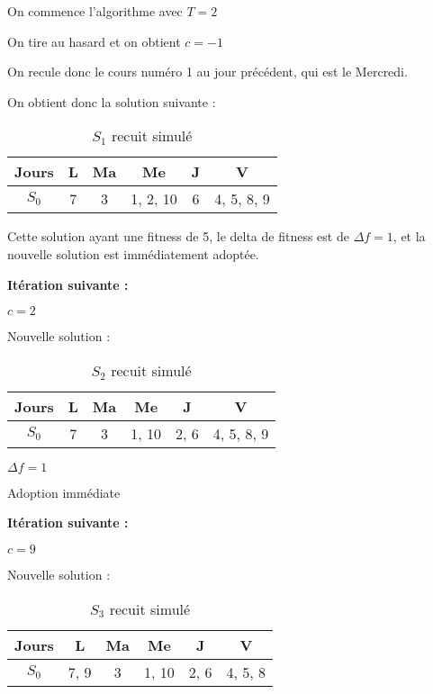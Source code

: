 {\setlength{\parindent}{0cm}

On commence l'algorithme avec $T=2$

    On tire au hasard et on obtient $c = -1$

    On recule donc le cours numéro 1 au jour précédent, qui est le Mercredi.

On obtient donc la solution suivante :


    \begin{table}[!h]
        \centering
        \begin{tabular}{|c|c|c|c|c|c|}
            \hline
            Jours & L & Ma & Me       & J & V          \\
            \hline
            $S_0$ & 7 & 3  & 1, 2, 10 & 6 & 4, 5, 8, 9 \\
            \hline
        \end{tabular}\caption{$S_1$ recuit simulé}
    \end{table}

    Cette solution ayant une fitness de 5, le delta de fitness est de $\Delta f = 1$, et la nouvelle solution est immédiatement adoptée.

\textbf{Itération suivante :}

    $c = 2$

    Nouvelle solution :

    \begin{table}[!h]
        \centering
        \begin{tabular}{|c|c|c|c|c|c|}
            \hline
            Jours & L & Ma & Me    & J    & V          \\
            \hline
            $S_0$ & 7 & 3  & 1, 10 & 2, 6 & 4, 5, 8, 9 \\
            \hline
        \end{tabular}\caption{$S_2$ recuit simulé}
    \end{table}

    $\Delta f = 1$

    Adoption immédiate

    \textbf{Itération suivante :}

    $c = 9$

    Nouvelle solution :

    \begin{table}[!h]
        \centering
        \begin{tabular}{|c|c|c|c|c|c|}
            \hline
            Jours & L    & Ma & Me    & J    & V       \\
            \hline
            $S_0$ & 7, 9 & 3  & 1, 10 & 2, 6 & 4, 5, 8 \\
            \hline
        \end{tabular}\caption{$S_3$ recuit simulé}
    \end{table}

}
